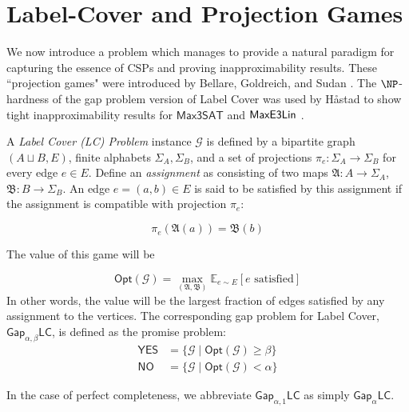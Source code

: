 \section{Label-Cover and Projection Games}
We now introduce a problem which manages to provide a natural paradigm for capturing the essence of CSPs and proving inapproximability results. These ``projection games" were introduced by Bellare, Goldreich, and Sudan \cite{bellare1998free}. The $\NP$-hardness of the gap problem version of Label Cover was used by H\aa stad to show tight inapproximability results for $\mathsf{Max3SAT}$ and $\mathsf{MaxE3Lin}$ \cite{haastad2001some}.

\begin{definition}
A \emph{Label Cover (LC) Problem} instance $\mathcal{G}$ is defined by a bipartite graph $(A \sqcup B,E)$, finite alphabets $\Sigma_A, \Sigma_B$, and a set of projections $\pi_e:\Sigma_A \rightarrow \Sigma_B$ for every edge $e \in E$. Define an \emph{assignment} as consisting of two maps $\mathfrak{A}: A \rightarrow \Sigma_A$, $\mathfrak{B}: B \rightarrow \Sigma_B$. An edge $e = (a,b) \in E$ is said to be satisfied by this assignment if the assignment is compatible with projection $\pi_e$:

\begin{equation}
  \pi_e(\mathfrak{A}(a)) = \mathfrak{B}(b)
\end{equation}

The value of this game will be

\begin{equation} \label{optvalLC}
  \mathsf{Opt}(\mathcal{G}) = \max_{(\mathfrak{A},\mathfrak{B})} \mathbb{E}_{e \sim E}[e \text{ satisfied}]
\end{equation}
In other words, the value will be the largest fraction of edges satisfied by any assignment to the vertices. The corresponding gap problem for Label Cover, $\mathsf{Gap}_{\alpha,\beta}\mathsf{LC}$, is defined as the promise problem:
%
\begin{align*}
    \mathsf{YES} & = \{\mathcal{G} \mid \mathsf{Opt}(\mathcal{G}) \geq \beta\} \\
    \mathsf{NO} & = \{\mathcal{G} \mid \mathsf{Opt}(\mathcal{G}) < \alpha \}
\end{align*}

In the case of perfect completeness, we abbreviate $\mathsf{Gap}_{\alpha,1}\mathsf{LC}$ as simply $\mathsf{Gap}_{\alpha}\mathsf{LC}$.
\end{definition}

